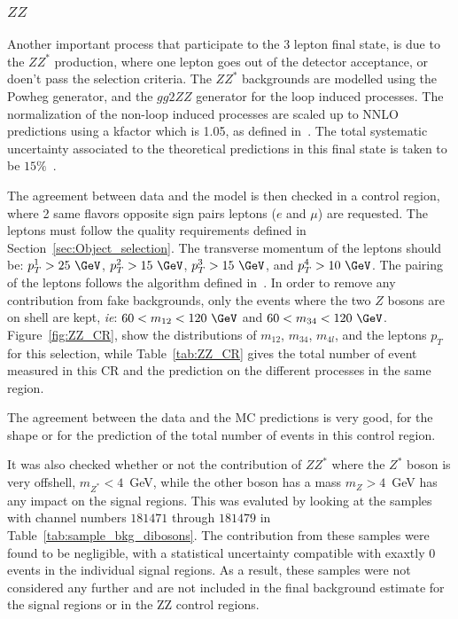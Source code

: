 \clearpage

\subsubsection{$ZZ$}
\label{sec:zzbg}

Another important process that participate to the 3 lepton final state, is due to the $ZZ^{*}$ production, where one lepton goes out of the detector acceptance, or doen't pass the selection criteria. The $ZZ^{*}$ backgrounds are modelled using the Powheg generator, and the $gg2ZZ$ generator for the loop induced processes. The normalization of the non-loop induced processes are scaled up to NNLO predictions using a kfactor which is 1.05, as defined in~\cite{Cascioli:2014yka,Baglio:2013toa,Bierweiler:2013dja}. The total systematic uncertainty associated to the theoretical predictions in this final state is taken to be $15\%$~\cite{Cascioli:2014yka,Baglio:2013toa,Bierweiler:2013dja}.

The agreement between data and the model is then checked in a control region, where 2 same flavors opposite sign pairs leptons ($e$ and $\mu$) are requested. The leptons must follow the quality requirements defined in Section~\ref{sec:Object_selection}. The transverse momentum of the leptons should be: $p_{T}^{1}>25~\GeV$, $p_{T}^{2}>15~\GeV$, $p_{T}^{3}>15~\GeV$, and  $p_{T}^{4}>10~\GeV$. The pairing of the leptons follows the algorithm defined in~\cite{Aad:2014wra}. In order to remove any contribution from fake backgrounds, only the events where the two $Z$ bosons are on shell are kept, \textit{ie}: $60<m_{12}<120~\GeV$ and $60<m_{34}<120~\GeV$. Figure~\ref{fig:ZZ_CR}, show the distributions of $m_{12}$, $m_{34}$, $m_{4l}$, and the leptons $p_{T}$ for this selection, while Table~\ref{tab:ZZ_CR} gives the total number of event measured in this CR and the prediction on the different processes in the same region.

The agreement between the data and the MC predictions is very good, for the shape or for the prediction of the total number of events in this control region.

It was also checked whether or not the contribution of $ZZ^{*}$ where the $Z^{*}$ boson is very offshell, $m_{Z^{*}} < 4$~GeV, while the other boson
has a  mass $m_Z > 4$~GeV has any impact on the signal regions. This was evaluted by looking at the samples with channel numbers
$181471$ through $181479$ in Table~\ref{tab:sample_bkg_dibosons}.  The contribution from these samples were found to be negligible, with a statistical
uncertainty compatible with exaxtly 0 events in the individual signal regions. As a result, these samples were not considered any further and are not
included in the final background  estimate for the signal regions or in the ZZ control regions.


